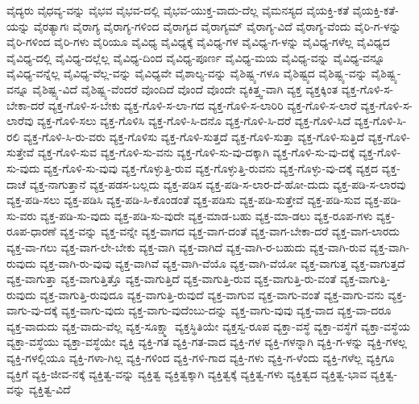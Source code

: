 {ವೈದ್ಯರು
ವೈಧವ್ಯ-ವನ್ನು
ವೈಭವ
ವೈಭವ-ದಲ್ಲಿ
ವೈಭವ-ಯುಕ್ತ-ವಾದು-ದೆಲ್ಲ
ವೈಮನಸ್ಯದ
ವೈಯಕ್ತಿ-ಕತೆ
ವೈಯಕ್ತಿ-ಕತೆ-ಯನ್ನು
ವೈರತ್ಯಾಗಃ
ವೈರಾಗ್ಯ
ವೈರಾಗ್ಯ-ಗಳಿಂದ
ವೈರಾಗ್ಯದ
ವೈರಾಗ್ಯಮ್
ವೈರಾಗ್ಯ-ವಿದೆ
ವೈರಾಗ್ಯ-ವೆಂದು
ವೈರಿ-ಗ-ಳನ್ನು
ವೈರಿ-ಗಳಿಂದ
ವೈರಿ-ಗಳು
ವೈರಿಯೂ
ವೈವಿಧ್ಯ
ವೈವಿಧ್ಯಕ್ಕೆ
ವೈವಿಧ್ಯ-ಗಳ
ವೈವಿಧ್ಯ-ಗ-ಳನ್ನು
ವೈವಿಧ್ಯ-ಗಳೆಲ್ಲ
ವೈವಿಧ್ಯದ
ವೈವಿಧ್ಯ-ದಲ್ಲಿ
ವೈವಿಧ್ಯ-ದಲ್ಲೆಲ್ಲ
ವೈವಿಧ್ಯ-ದಿಂದ
ವೈವಿಧ್ಯ-ಪೂರ್ಣ
ವೈವಿಧ್ಯ-ಮಯ
ವೈವಿಧ್ಯ-ವನ್ನು
ವೈವಿಧ್ಯ-ವನ್ನೂ
ವೈವಿಧ್ಯ-ವನ್ನೆಲ್ಲ
ವೈವಿಧ್ಯ-ವೆಲ್ಲ-ವನ್ನು
ವೈವಿಧ್ಯವೇ
ವೈಶಾಲ್ಯ-ವನ್ನು
ವೈಶಿಷ್ಟ್ಯ-ಗಳೂ
ವೈಶಿಷ್ಟ್ಯದ
ವೈಶಿಷ್ಟ್ಯ-ವನ್ನು
ವೈಶಿಷ್ಟ್ಯ-ವನ್ನೂ
ವೈಶಿಷ್ಟ್ಯ-ವಿದೆ
ವೈಶಿಷ್ಟ್ಯ-ವೆಂದರೆ
ವೊಂದಿದೆ
ವೊಂದೆ
ವೊಂದೇ
ವ್ಯಕಿತ್ತ್ವ-ವಾಗಿ
ವ್ಯಕ್ತ
ವ್ಯಕ್ತಕ್ಕಿಂತ
ವ್ಯಕ್ತ-ಗೊಳಿ-ಸ-ಬೇಕಾ-ದರೆ
ವ್ಯಕ್ತ-ಗೊಳಿ-ಸ-ಬೇಕು
ವ್ಯಕ್ತ-ಗೊಳಿ-ಸ-ಲಾ-ಗದ
ವ್ಯಕ್ತ-ಗೊಳಿ-ಸ-ಲಾರಿರಿ
ವ್ಯಕ್ತ-ಗೊಳಿ-ಸ-ಲಾರೆ
ವ್ಯಕ್ತ-ಗೊಳಿ-ಸ-ಲಾರೆವು
ವ್ಯಕ್ತ-ಗೊಳಿ-ಸಲು
ವ್ಯಕ್ತ-ಗೊಳಿಸಿ
ವ್ಯಕ್ತ-ಗೊಳಿ-ಸಿ-ದನೊ
ವ್ಯಕ್ತ-ಗೊಳಿ-ಸಿ-ದರೆ
ವ್ಯಕ್ತ-ಗೊಳಿ-ಸಿದೆ
ವ್ಯಕ್ತ-ಗೊಳಿ-ಸಿ-ರಲಿ
ವ್ಯಕ್ತ-ಗೊಳಿ-ಸಿ-ರು-ವರು
ವ್ಯಕ್ತ-ಗೊಳಿಸು
ವ್ಯಕ್ತ-ಗೊಳಿ-ಸುತ್ತದೆ
ವ್ಯಕ್ತ-ಗೊಳಿ-ಸುತ್ತಾ
ವ್ಯಕ್ತ-ಗೊಳಿ-ಸುತ್ತಿದೆ
ವ್ಯಕ್ತ-ಗೊಳಿ-ಸುತ್ತೇವೆ
ವ್ಯಕ್ತ-ಗೊಳಿ-ಸುವ
ವ್ಯಕ್ತ-ಗೊಳಿ-ಸು-ವನು
ವ್ಯಕ್ತ-ಗೊಳಿ-ಸು-ವು-ದಕ್ಕಾಗಿ
ವ್ಯಕ್ತ-ಗೊಳಿ-ಸು-ವು-ದಕ್ಕೆ
ವ್ಯಕ್ತ-ಗೊಳಿ-ಸು-ವುದು
ವ್ಯಕ್ತ-ಗೊಳಿ-ಸು-ವುವು
ವ್ಯಕ್ತ-ಗೊಳ್ಳುತ್ತಿ-ರುವ
ವ್ಯಕ್ತ-ಗೊಳ್ಳುತ್ತಿ-ರುವನು
ವ್ಯಕ್ತ-ಗೊಳ್ಳು-ವು-ದಕ್ಕೆ
ವ್ಯಕ್ತದ
ವ್ಯಕ್ತ-ದಾಚೆ
ವ್ಯಕ್ತ-ನಾಗುತ್ತಾನೆ
ವ್ಯಕ್ತ-ಪಡಸ-ಬಲ್ಲದು
ವ್ಯಕ್ತ-ಪಡಿಸ
ವ್ಯಕ್ತ-ಪಡಿ-ಸ-ಲಾರ-ದೆ-ಹೋ-ದುದು
ವ್ಯಕ್ತ-ಪಡಿ-ಸ-ಲಾರವು
ವ್ಯಕ್ತ-ಪಡಿ-ಸಲು
ವ್ಯಕ್ತ-ಪಡಿಸಿ
ವ್ಯಕ್ತ-ಪಡಿ-ಸಿ-ಕೊಂಡಂತೆ
ವ್ಯಕ್ತ-ಪಡಿಸು
ವ್ಯಕ್ತ-ಪಡಿ-ಸುತ್ತೇವೆ
ವ್ಯಕ್ತ-ಪಡಿ-ಸುವ
ವ್ಯಕ್ತ-ಪಡಿ-ಸು-ವರು
ವ್ಯಕ್ತ-ಪಡಿ-ಸು-ವುದು
ವ್ಯಕ್ತ-ಪಡಿ-ಸು-ವುದೇ
ವ್ಯಕ್ತ-ಮಾಡ-ಬಹು
ವ್ಯಕ್ತ-ಮಾ-ಡಲು
ವ್ಯಕ್ತ-ರೂಪ-ಗಳು
ವ್ಯಕ್ತ-ರೂಪ-ಧಾರಣೆ
ವ್ಯಕ್ತ-ವನ್ನು
ವ್ಯಕ್ತ-ವನ್ನೇ
ವ್ಯಕ್ತ-ವಾಗದ
ವ್ಯಕ್ತ-ವಾಗ-ದಂತೆ
ವ್ಯಕ್ತ-ವಾಗ-ಬೇಕಾ-ದರೆ
ವ್ಯಕ್ತ-ವಾಗ-ಲಾರದು
ವ್ಯಕ್ತ-ವಾ-ಗಲು
ವ್ಯಕ್ತ-ವಾಗ-ಲೇ-ಬೇಕು
ವ್ಯಕ್ತ-ವಾಗಿ
ವ್ಯಕ್ತ-ವಾಗಿದೆ
ವ್ಯಕ್ತ-ವಾಗಿ-ರ-ಬಹುದು
ವ್ಯಕ್ತ-ವಾಗಿ-ರುವ
ವ್ಯಕ್ತ-ವಾಗಿ-ರುವುದು
ವ್ಯಕ್ತ-ವಾಗಿ-ರು-ವುವು
ವ್ಯಕ್ತ-ವಾಗಿವೆ
ವ್ಯಕ್ತ-ವಾಗಿ-ವೆಯೊ
ವ್ಯಕ್ತ-ವಾಗಿ-ವೆಯೋ
ವ್ಯಕ್ತ-ವಾಗುತ್ತ
ವ್ಯಕ್ತ-ವಾಗುತ್ತದೆ
ವ್ಯಕ್ತ-ವಾಗುತ್ತಾ
ವ್ಯಕ್ತ-ವಾಗುತ್ತಿತ್ತೊ
ವ್ಯಕ್ತ-ವಾಗುತ್ತಿದೆ
ವ್ಯಕ್ತ-ವಾಗುತ್ತಿ-ರುವ
ವ್ಯಕ್ತ-ವಾಗುತ್ತಿ-ರು-ವಂತೆ
ವ್ಯಕ್ತ-ವಾಗುತ್ತಿ-ರುವುದು
ವ್ಯಕ್ತ-ವಾಗುತ್ತಿ-ರುವುದೂ
ವ್ಯಕ್ತ-ವಾಗುತ್ತಿ-ರುವುದೆ
ವ್ಯಕ್ತ-ವಾಗುವ
ವ್ಯಕ್ತ-ವಾಗು-ವಂತೆ
ವ್ಯಕ್ತ-ವಾಗು-ವನು
ವ್ಯಕ್ತ-ವಾಗು-ವು-ದಕ್ಕೆ
ವ್ಯಕ್ತ-ವಾಗು-ವುದು
ವ್ಯಕ್ತ-ವಾಗು-ವುದೆಂಬು-ದನ್ನು
ವ್ಯಕ್ತ-ವಾಗು-ವುವು
ವ್ಯಕ್ತ-ವಾದ
ವ್ಯಕ್ತ-ವಾ-ದರೂ
ವ್ಯಕ್ತ-ವಾದುದು
ವ್ಯಕ್ತ-ವಾದು-ವೆಲ್ಲ
ವ್ಯಕ್ತ-ಸೂಕ್ಷ್ಮಾ
ವ್ಯಕ್ತಸ್ಥಿತಿಯೇ
ವ್ಯಕ್ತಸ್ವ-ರೂಪ
ವ್ಯಕ್ತಾ-ವಸ್ಥೆ
ವ್ಯಕ್ತಾ-ವಸ್ಥೆಗೆ
ವ್ಯಕ್ತಾ-ವಸ್ಥೆಯ
ವ್ಯಕ್ತಾ-ವಸ್ಥೆಯು
ವ್ಯಕ್ತಾ-ವಸ್ಥೆಯೇ
ವ್ಯಕ್ತಿ
ವ್ಯಕ್ತಿ-ಗತ
ವ್ಯಕ್ತಿ-ಗತ-ವಾದ
ವ್ಯಕ್ತಿ-ಗಳ
ವ್ಯಕ್ತಿ-ಗಳನ್ನಾಗಿ
ವ್ಯಕ್ತಿ-ಗ-ಳನ್ನು
ವ್ಯಕ್ತಿ-ಗಳಲ್ಲ
ವ್ಯಕ್ತಿ-ಗಳಲ್ಲಿಯೂ
ವ್ಯಕ್ತಿ-ಗಳಾ-ಗಿಲ್ಲ
ವ್ಯಕ್ತಿ-ಗಳಿಂದ
ವ್ಯಕ್ತಿ-ಗಳಿ-ಗಾದ
ವ್ಯಕ್ತಿ-ಗಳು
ವ್ಯಕ್ತಿ-ಗ-ಳೆಂದು
ವ್ಯಕ್ತಿ-ಗಳೆಲ್ಲ
ವ್ಯಕ್ತಿಗೂ
ವ್ಯಕ್ತಿಗೆ
ವ್ಯಕ್ತಿ-ಜೀವ-ನಕ್ಕೆ
ವ್ಯಕ್ತಿತ್ವ-ವನ್ನು
ವ್ಯಕ್ತಿತ್ವ
ವ್ಯಕ್ತಿತ್ವಕ್ಕಾಗಿ
ವ್ಯಕ್ತಿತ್ವಕ್ಕೆ
ವ್ಯಕ್ತಿತ್ವ-ಗಳು
ವ್ಯಕ್ತಿತ್ವದ
ವ್ಯಕ್ತಿತ್ವ-ಭಾವ
ವ್ಯಕ್ತಿತ್ವ-ವನ್ನು
ವ್ಯಕ್ತಿತ್ವ-ವಿದೆ
}
